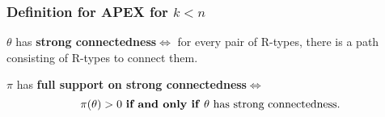 \documentclass[9pt]{beamer}
\begin{document}


\begin{frame}
  \frametitle{Definition for APEX for $k<n$}


\begin{definition}
$\theta$ has \textbf{strong connectedness}$\Leftrightarrow$ for every pair of R-types, there is a path consisting of R-types to connect them.
\end{definition}  

\begin{definition}
$\pi$ has \textbf{full support on strong connectedness}$\Leftrightarrow$ 
\[\text{$\pi(\theta)>0$ \textbf{if and only if} $\theta$ has strong connectedness.}\]
\end{definition}  

%        
%
%    
%        
%

\end{frame}
\end{document}
